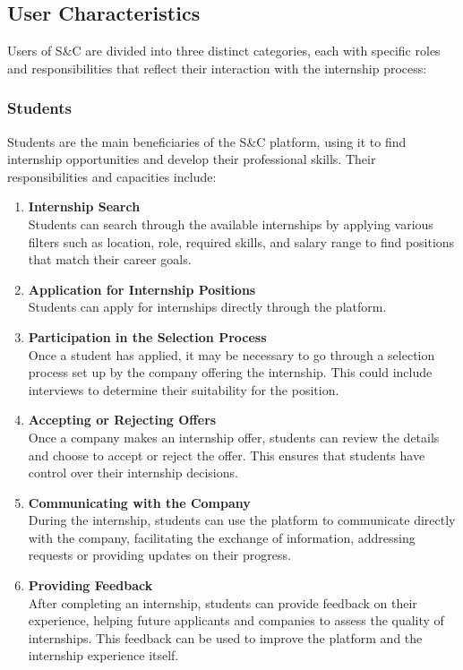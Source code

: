 \subsection{User Characteristics}
    Users of S\&C are divided into three distinct categories, each with specific roles and responsibilities that reflect their interaction with the internship process:
    
    \subsubsection{Students}
    Students are the main beneficiaries of the S\&C platform, using it to find internship opportunities and develop their professional skills. Their responsibilities and capacities include:
    \begin{enumerate}[label=\textbullet, itemsep=0em]
        \item \textbf{Internship Search}
        \\ Students can search through the available internships by applying various filters such as location, role, required skills, and salary range to find positions that match their career goals.
        
        \item \textbf{Application for Internship Positions}
        \\ Students can apply for internships directly through the platform.

        \item \textbf{Participation in the Selection Process}
        \\ Once a student has applied, it may be necessary to go through a selection process set up by the company offering the internship. This could include interviews to determine their suitability for the position.

        \item \textbf{Accepting or Rejecting Offers}
        \\ Once a company makes an internship offer, students can review the details and choose to accept or reject the offer. This ensures that students have control over their internship decisions.

        \item \textbf{Communicating with the Company}
        \\ During the internship, students can use the platform to communicate directly with the company, facilitating the exchange of information, addressing requests or providing updates on their progress.
        
        \item \textbf{Providing Feedback}
        \\ After completing an internship, students can provide feedback on their experience, helping future applicants and companies to assess the quality of internships. This feedback can be used to improve the platform and the internship experience itself.
    \end{enumerate}
    
